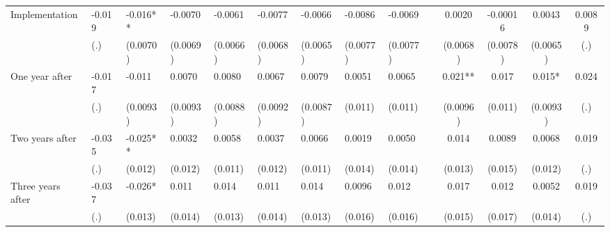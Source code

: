 \begin{tabular}{lccccrrrrrcccc}
Implementation & \multicolumn{1}{l}{-0.019} & \multicolumn{1}{l}{-0.016**} & \multicolumn{1}{l}{-0.0070} & \multicolumn{1}{l}{-0.0061} & \multicolumn{1}{l}{-0.0077} & \multicolumn{1}{l}{-0.0066} & \multicolumn{1}{l}{-0.0086} & \multicolumn{1}{l}{-0.0069} &       & 0.0020 & -0.00016 & 0.0043 & 0.0089 \\
      & \multicolumn{1}{l}{(.)} & \multicolumn{1}{l}{(0.0070)} & \multicolumn{1}{l}{(0.0069)} & \multicolumn{1}{l}{(0.0066)} & \multicolumn{1}{l}{(0.0068)} & \multicolumn{1}{l}{(0.0065)} & \multicolumn{1}{l}{(0.0077)} & \multicolumn{1}{l}{(0.0077)} &       & (0.0068) & (0.0078) & (0.0065) & (.) \\
One year after & \multicolumn{1}{l}{-0.017} & \multicolumn{1}{l}{-0.011} & \multicolumn{1}{l}{0.0070} & \multicolumn{1}{l}{0.0080} & \multicolumn{1}{l}{0.0067} & \multicolumn{1}{l}{0.0079} & \multicolumn{1}{l}{0.0051} & \multicolumn{1}{l}{0.0065} &       & 0.021** & 0.017 & 0.015* & 0.024 \\
      & \multicolumn{1}{l}{(.)} & \multicolumn{1}{l}{(0.0093)} & \multicolumn{1}{l}{(0.0093)} & \multicolumn{1}{l}{(0.0088)} & \multicolumn{1}{l}{(0.0092)} & \multicolumn{1}{l}{(0.0087)} & \multicolumn{1}{l}{(0.011)} & \multicolumn{1}{l}{(0.011)} &       & (0.0096) & (0.011) & (0.0093) & (.) \\
Two years after & \multicolumn{1}{l}{-0.035} & \multicolumn{1}{l}{-0.025**} & \multicolumn{1}{l}{0.0032} & \multicolumn{1}{l}{0.0058} & \multicolumn{1}{l}{0.0037} & \multicolumn{1}{l}{0.0066} & \multicolumn{1}{l}{0.0019} & \multicolumn{1}{l}{0.0050} &       & 0.014 & 0.0089 & 0.0068 & 0.019 \\
      & \multicolumn{1}{l}{(.)} & \multicolumn{1}{l}{(0.012)} & \multicolumn{1}{l}{(0.012)} & \multicolumn{1}{l}{(0.011)} & \multicolumn{1}{l}{(0.012)} & \multicolumn{1}{l}{(0.011)} & \multicolumn{1}{l}{(0.014)} & \multicolumn{1}{l}{(0.014)} &       & (0.013) & (0.015) & (0.012) & (.) \\
Three years after & \multicolumn{1}{l}{-0.037} & \multicolumn{1}{l}{-0.026*} & \multicolumn{1}{l}{0.011} & \multicolumn{1}{l}{0.014} & \multicolumn{1}{l}{0.011} & \multicolumn{1}{l}{0.014} & \multicolumn{1}{l}{0.0096} & \multicolumn{1}{l}{0.012} &       & 0.017 & 0.012 & 0.0052 & 0.019 \\
      & \multicolumn{1}{l}{(.)} & \multicolumn{1}{l}{(0.013)} & \multicolumn{1}{l}{(0.014)} & \multicolumn{1}{l}{(0.013)} & \multicolumn{1}{l}{(0.014)} & \multicolumn{1}{l}{(0.013)} & \multicolumn{1}{l}{(0.016)} & \multicolumn{1}{l}{(0.016)} &       & (0.015) & (0.017) & (0.014) & (.) \\

\end{tabular}
